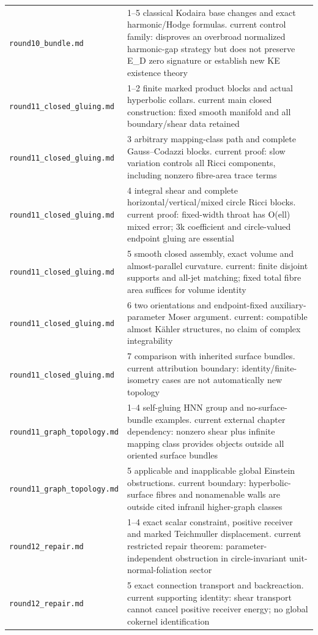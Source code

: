 \documentclass[UTF8,fontset=fandol,zihao=-4]{ctexart}
\theoremstyle{cn}
\begin{document}
\begin{longtable}{L{.34\textwidth}L{.59\textwidth}}
\nolinkurl{round10_bundle.md} & 1–5 classical Kodaira base changes and exact harmonic/Hodge formulas. current control family: disproves an overbroad normalized harmonic-gap strategy but does not preserve E\_D zero signature or establish new KE existence theory\\
\nolinkurl{round11_closed_gluing.md} & 1–2 finite marked product blocks and actual hyperbolic collars. current main closed construction: fixed smooth manifold and all boundary/shear data retained\\
\nolinkurl{round11_closed_gluing.md} & 3 arbitrary mapping-class path and complete Gauss–Codazzi blocks. current proof: slow variation controls all Ricci components, including nonzero fibre-area trace terms\\
\nolinkurl{round11_closed_gluing.md} & 4 integral shear and complete horizontal/vertical/mixed circle Ricci blocks. current proof: fixed-width throat has O(ell) mixed error; 3k coefficient and circle-valued endpoint gluing are essential\\
\nolinkurl{round11_closed_gluing.md} & 5 smooth closed assembly, exact volume and almost-parallel curvature. current: finite disjoint supports and all-jet matching; fixed total fibre area suffices for volume identity\\
\nolinkurl{round11_closed_gluing.md} & 6 two orientations and endpoint-fixed auxiliary-parameter Moser argument. current: compatible almost Kähler structures, no claim of complex integrability\\
\nolinkurl{round11_closed_gluing.md} & 7 comparison with inherited surface bundles. current attribution boundary: identity/finite-isometry cases are not automatically new topology\\
\nolinkurl{round11_graph_topology.md} & 1–4 self-gluing HNN group and no-surface-bundle examples. current external chapter dependency: nonzero shear plus infinite mapping class provides objects outside all oriented surface bundles\\
\nolinkurl{round11_graph_topology.md} & 5 applicable and inapplicable global Einstein obstructions. current boundary: hyperbolic-surface fibres and nonamenable walls are outside cited infranil higher-graph classes\\
\nolinkurl{round12_repair.md} & 1–4 exact scalar constraint, positive receiver and marked Teichmuller displacement. current restricted repair theorem: parameter-independent obstruction in circle-invariant unit-normal-foliation sector\\
\nolinkurl{round12_repair.md} & 5 exact connection transport and backreaction. current supporting identity: shear transport cannot cancel positive receiver energy; no global cokernel identification\\

\end{longtable}
\end{document}
